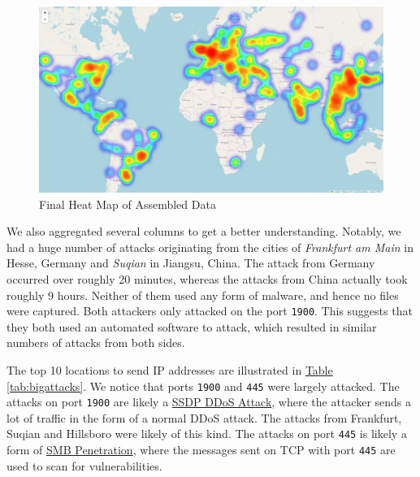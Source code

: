 \documentclass[12pt,usenames,dvipsnames]{iopart}
\newcommand{\reftable}[1]{\hyperref[#1]{Table \ref*{#1}}}
\begin{document}
\begin{figure}[h]
    \centering
    \includegraphics[width=\textwidth]{images/heatmap.png}
    \caption{Final Heat Map of Assembled Data}
    \label{fig:heatmap}
\end{figure}

We also aggregated several columns to get a better understanding. Notably, we had a huge number of attacks originating from the cities of \emph{Frankfurt am Main} in Hesse, Germany and \emph{Suqian} in Jiangsu, China. The attack from Germany occurred over roughly 20 minutes, whereas the attacks from China actually took roughly 9 hours. Neither of them used any form of malware, and hence no files were captured. Both attackers only attacked on the port \texttt{1900}. This suggests that they both used an automated software to attack, which resulted in similar numbers of attacks from both sides.

The top 10 locations to send IP addresses are illustrated in \reftable{tab:bigattacks}. We notice that ports \texttt{1900} and \texttt{445} were largely attacked. The attacks on port \texttt{1900} are likely a \href{https://www.cloudflare.com/learning/ddos/ssdp-ddos-attack/}{SSDP DDoS Attack}, where the attacker sends a lot of traffic in the form of a normal DDoS attack. The attacks from Frankfurt, Suqian and Hillsboro were likely of this kind. The attacks on port \texttt{445} is likely a form of \href{https://www.hackingarticles.in/smb-penetration-testing-port-445/}{SMB Penetration}, where the messages sent on TCP with port \texttt{445} are used to scan for vulnerabilities.
\end{document}

